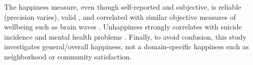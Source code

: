 \documentclass[12pt, letterpaper]{article}
\begin{document}
\begin{spacing}{1.9}
The  happiness measure, even though self-reported and subjective,
 is  reliable  (precision varies),
 valid \citep{ditella06m,myers00}, %
 and  correlated with similar objective
 measures  of wellbeing  such as brain waves \citep{layard05}.
  Unhappiness strongly
  correlates with suicide incidence and mental health problems
  \citep{bray06g}. 
Finally, to avoid confusion, this 
  study investigates general/overall happiness, not a domain-specific happiness
  such as neighborhood or community satisfaction. 


\end{spacing}
\end{document}
